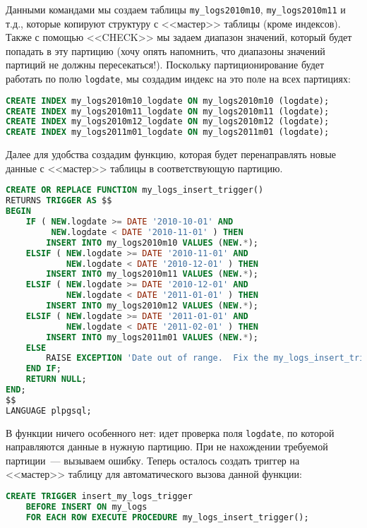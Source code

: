 Данными командами мы создаем таблицы \lstinline!my_logs2010m10!, \lstinline!my_logs2010m11! и т.д., которые копируют структуру с <<мастер>> таблицы (кроме индексов). Также с помощью <<CHECK>> мы задаем диапазон значений, который будет попадать в эту партицию (хочу опять напомнить, что диапазоны значений партиций не должны пересекаться!). Поскольку партиционирование будет работать по полю \lstinline!logdate!, мы создадим индекс на это поле на всех партициях:

\begin{lstlisting}[language=SQL,label=lst:partitioning4,caption=Создание индексов]
CREATE INDEX my_logs2010m10_logdate ON my_logs2010m10 (logdate);
CREATE INDEX my_logs2010m11_logdate ON my_logs2010m11 (logdate);
CREATE INDEX my_logs2010m12_logdate ON my_logs2010m12 (logdate);
CREATE INDEX my_logs2011m01_logdate ON my_logs2011m01 (logdate);
\end{lstlisting}

Далее для удобства создадим функцию, которая будет перенаправлять новые данные с <<мастер>> таблицы в соответствующую партицию.

\begin{lstlisting}[language=SQL,label=lst:partitioning5,caption=Функция для перенаправления]
CREATE OR REPLACE FUNCTION my_logs_insert_trigger()
RETURNS TRIGGER AS $$
BEGIN
    IF ( NEW.logdate >= DATE '2010-10-01' AND
         NEW.logdate < DATE '2010-11-01' ) THEN
        INSERT INTO my_logs2010m10 VALUES (NEW.*);
    ELSIF ( NEW.logdate >= DATE '2010-11-01' AND
            NEW.logdate < DATE '2010-12-01' ) THEN
        INSERT INTO my_logs2010m11 VALUES (NEW.*);
    ELSIF ( NEW.logdate >= DATE '2010-12-01' AND
            NEW.logdate < DATE '2011-01-01' ) THEN
        INSERT INTO my_logs2010m12 VALUES (NEW.*);
    ELSIF ( NEW.logdate >= DATE '2011-01-01' AND
            NEW.logdate < DATE '2011-02-01' ) THEN
        INSERT INTO my_logs2011m01 VALUES (NEW.*);
    ELSE
        RAISE EXCEPTION 'Date out of range.  Fix the my_logs_insert_trigger() function!';
    END IF;
    RETURN NULL;
END;
$$
LANGUAGE plpgsql;
\end{lstlisting}

В функции ничего особенного нет: идет проверка поля \lstinline!logdate!, по которой направляются данные в нужную партицию. При не нахождении требуемой партиции~--- вызываем ошибку. Теперь осталось создать триггер на <<мастер>> таблицу для автоматического вызова данной функции:

\begin{lstlisting}[language=SQL,label=lst:partitioning6,caption=Триггер]
CREATE TRIGGER insert_my_logs_trigger
    BEFORE INSERT ON my_logs
    FOR EACH ROW EXECUTE PROCEDURE my_logs_insert_trigger();
\end{lstlisting}

